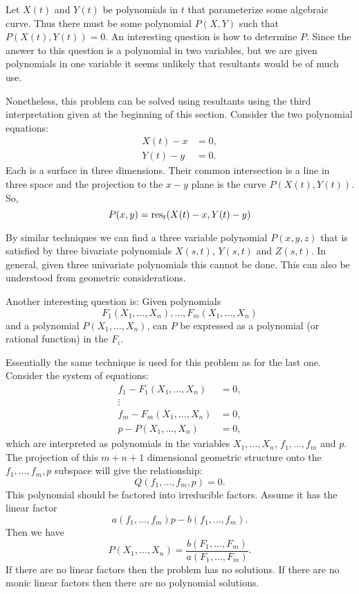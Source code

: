Let $X(t)$ and $Y(t)$ be polynomials in $t$ that parameterize some
algebraic curve.  Thus there must be some polynomial $P(X, Y)$ such
that $P(X(t), Y(t)) = 0$.  An interesting question is how to determine
$P$.  Since the answer to this question is a polynomial in two
variables, but we are given polynomials in one variable it seems
unlikely that resultants would be of much use.

Nonetheless, this problem can be solved using resultants using the
third interpretation given at the beginning of this section.  Consider
the two polynomial equations:
\[
\begin{aligned}
X(t) -x & = 0, \\
Y(t) - y & = 0.
\end{aligned}
\]
Each is a surface in three dimensions.  Their common intersection is
a line in three space and the projection to the $x-y$ plane is the
curve $P(X(t), Y(t))$.  So,
\[
P(x, y) = \mathop{\rm res}\nolimits_{t}(X(t) - x, Y(t) - y)
\]

By similar techniques we can find a three variable polynomial $P(x, y,
z)$ that is satisfied by three bivariate polynomials $X(s, t)$, $Y(s,
t)$ and $Z(s, t)$.  In general, given three univariate polynomials
this cannot be done.  This can also be understood from geometric
considerations. 

\medskip
Another interesting question is: Given polynomials 
\[
F_1(X_1, \ldots, X_n), \ldots, F_m(X_1, \ldots, X_n)
\]
and a polynomial $P(X_1, \ldots, X_n)$, can $P$ be expressed as a
polynomial (or rational function) in the $F_i$.

Essentially the same technique is used for this problem as for the last
one.  Consider the system of equations:
\[
\begin{aligned}
f_1 - F_1(X_1, \ldots, X_n) & = 0, \\
\vdots \\
f_m - F_m(X_1, \ldots, X_n) & = 0, \\
p - P(X_1, \ldots, X_n) & = 0,
\end{aligned}
\]
which are interpreted as polynomials in the variables $X_1,
\ldots, X_n$, $f_1, \ldots, f_m$ and $p$.  The projection of this
$m+n+1$ dimensional geometric structure onto the $f_1, \ldots, f_m, p$
subspace will give the relationship:
\[
Q(f_1, \ldots, f_m, p) = 0.
\]
This polynomial should be factored into irreducible factors.  Assume
it has the linear factor
\[
a(f_1, \ldots, f_m) p - b(f_1, \ldots, f_m).
\]
Then we have 
\[
P(X_1, \ldots, X_n) = \frac{b(F_1, \ldots, F_m)}{a(F_1, \ldots, F_m)}.
\]
If there are no linear factors then the problem has no solutions.  If
there are no monic linear factors then there are no polynomial
solutions.  

